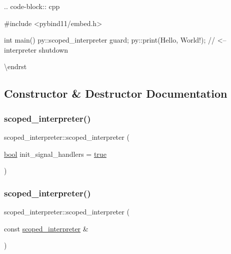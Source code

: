 .. code-\/block\+:: cpp \begin{DoxyVerb}#include <pybind11/embed.h>

int main() {
    py::scoped_interpreter guard{};
    py::print(Hello, World!);
} // <-- interpreter shutdown
\end{DoxyVerb}
 \textbackslash{}endrst 

\subsection{Constructor \& Destructor Documentation}
\mbox{\label{classscoped__interpreter_a6ba04e4795ec864e8e23289819225bef}} 
\subsubsection{\texorpdfstring{scoped\_interpreter()}{scoped\_interpreter()}\hspace{0.1cm}{\footnotesize\ttfamily [1/3]}}
{\footnotesize\ttfamily scoped\+\_\+interpreter\+::scoped\+\_\+interpreter (\begin{DoxyParamCaption}\item[{\mbox{\hyperlink{asdl_8h_af6a258d8f3ee5206d682d799316314b1}{bool}}}]{init\+\_\+signal\+\_\+handlers = {\ttfamily \mbox{\hyperlink{asdl_8h_af6a258d8f3ee5206d682d799316314b1a08f175a5505a10b9ed657defeb050e4b}{true}}} }\end{DoxyParamCaption})\hspace{0.3cm}{\ttfamily [inline]}}

\mbox{\label{classscoped__interpreter_a794109d4db2ba5daf345b9262b85ec3e}} 
\subsubsection{\texorpdfstring{scoped\_interpreter()}{scoped\_interpreter()}\hspace{0.1cm}{\footnotesize\ttfamily [2/3]}}
{\footnotesize\ttfamily scoped\+\_\+interpreter\+::scoped\+\_\+interpreter (\begin{DoxyParamCaption}\item[{const \mbox{\hyperlink{classscoped__interpreter}{scoped\+\_\+interpreter}} \&}]{ }\end{DoxyParamCaption})\hspace{0.3cm}{\ttfamily [delete]}}

